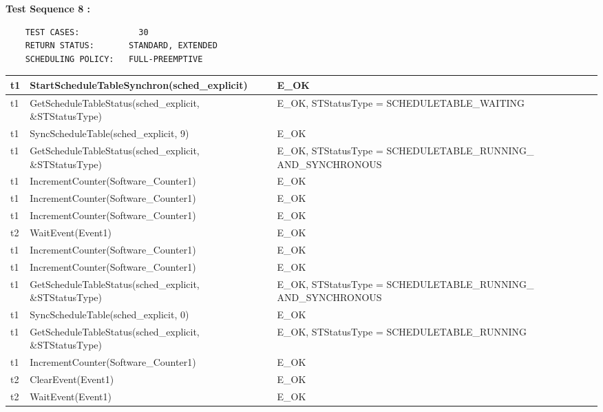 \documentclass[10pt]{article}
\newlength{\Li}\settowidth{\Li}{Running}
\newlength{\Lii}\setlength{\Lii}{7cm}
\newlength{\Liiii}\setlength{\Liiii}{0.9cm}
\newlength{\Liii}\setlength{\Liii}{\textwidth} \addtolength{\Liii}{-\Li} \addtolength{\Liii}{-\Lii} \addtolength{\Liii}{-\Liiii}
\begin{document}
	\textbf{Test Sequence 8 :}
	\begin{lstlisting}
	TEST CASES:		       30
	RETURN STATUS:	  	 STANDARD, EXTENDED
	SCHEDULING POLICY:   FULL-PREEMPTIVE
	\end{lstlisting}
	
	
	\begin{supertabular}{|p{\Li}|p{\Lii}|p{\Liii}|p{\Liiii}|} \hline 
	t1		& StartScheduleTableSynchron(sched\_explicit)					& E\_OK																	& \\ \hline
	t1		& GetScheduleTableStatus(sched\_explicit, \&STStatusType)			& E\_OK, STStatusType = SCHEDULETABLE\_WAITING								& \\ \hline
	t1		& SyncScheduleTable(sched\_explicit, 9)							& E\_OK																	& \\ \hline
	t1		& GetScheduleTableStatus(sched\_explicit, \&STStatusType)			& E\_OK, STStatusType = SCHEDULETABLE\_RUNNING\_ AND\_SYNCHRONOUS		& \\ \hline
	t1		& IncrementCounter(Software\_Counter1)						& E\_OK																	& \\ \hline
	t1		& IncrementCounter(Software\_Counter1)						& E\_OK																	& \\ \hline
	t1		& IncrementCounter(Software\_Counter1)						& E\_OK																	& \\ \hline
	t2		& WaitEvent(Event1)											& E\_OK																	& \\ \hline
	t1		& IncrementCounter(Software\_Counter1)						& E\_OK																	& \\ \hline
	t1		& IncrementCounter(Software\_Counter1)						& E\_OK																	& \\ \hline
	t1		& GetScheduleTableStatus(sched\_explicit, \&STStatusType)			& E\_OK, STStatusType = SCHEDULETABLE\_RUNNING\_ AND\_SYNCHRONOUS		& \\ \hline
	t1		& SyncScheduleTable(sched\_explicit, 0)							& E\_OK																	& \\ \hline
	t1		& GetScheduleTableStatus(sched\_explicit, \&STStatusType)			& E\_OK, STStatusType = SCHEDULETABLE\_RUNNING 							& \\ \hline
	t1		& IncrementCounter(Software\_Counter1)						& E\_OK																	& \\ \hline
	t2		& ClearEvent(Event1)										& E\_OK																	& \\ \hline
	t2		& WaitEvent(Event1)											& E\_OK																	& \\ \hline

\end{supertabular}
\end{document}
